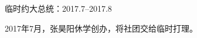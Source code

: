 \begin{section}{临时约大总统：2017.7--2017.8}
	\label{history:临时约大总统}

	2017年7月，张昊阳休学创办，将社团交给临时打理。
\end{section}